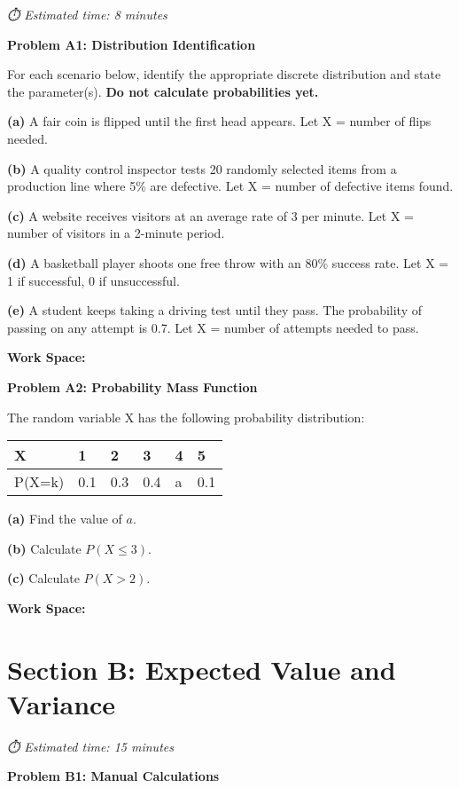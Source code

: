 \documentclass[
  11pt,
]{article}
\begin{document}
\emph{⏱️ Estimated time: 8 minutes}

\textbf{Problem A1: Distribution Identification}

For each scenario below, identify the appropriate discrete distribution
and state the parameter(s). \textbf{Do not calculate probabilities yet.}

\textbf{(a)} A fair coin is flipped until the first head appears. Let X
= number of flips needed.

\textbf{(b)} A quality control inspector tests 20 randomly selected
items from a production line where 5\% are defective. Let X = number of
defective items found.

\textbf{(c)} A website receives visitors at an average rate of 3 per
minute. Let X = number of visitors in a 2-minute period.

\textbf{(d)} A basketball player shoots one free throw with an 80\%
success rate. Let X = 1 if successful, 0 if unsuccessful.

\textbf{(e)} A student keeps taking a driving test until they pass. The
probability of passing on any attempt is 0.7. Let X = number of attempts
needed to pass.

\textbf{Work Space:}

\textbf{Problem A2: Probability Mass Function}

The random variable X has the following probability distribution:

\begin{longtable}[]{@{}llllll@{}}
\toprule\noalign{}
X & 1 & 2 & 3 & 4 & 5 \\
\midrule\noalign{}
\endhead
\bottomrule\noalign{}
\endlastfoot
P(X=k) & 0.1 & 0.3 & 0.4 & a & 0.1 \\
\end{longtable}

\textbf{(a)} Find the value of \(a\).

\textbf{(b)} Calculate \(P(X \leq 3)\).

\textbf{(c)} Calculate \(P(X > 2)\).

\textbf{Work Space:}

\section{Section B: Expected Value and
Variance}\label{section-b-expected-value-and-variance}

\emph{⏱️ Estimated time: 15 minutes}

\textbf{Problem B1: Manual Calculations}
\end{document}
